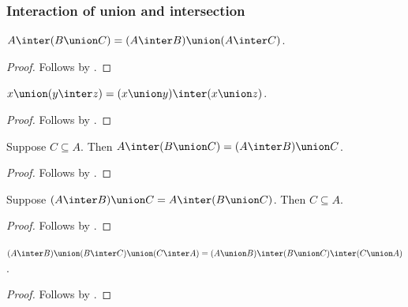 \subsubsection{Interaction of union and intersection}

\begin{proposition}%
\label{inter_distrib_union}
    $A\inter (B\union C) = (A\inter B)\union (A\inter C)$.
\end{proposition}
\begin{proof}
    Follows by .
\end{proof}

\begin{proposition}%
\label{union_distrib_inter}
    $x\union (y\inter z) = (x\union y)\inter (x\union z)$.
\end{proposition}
\begin{proof}
    Follows by .
\end{proof}

\begin{proposition}\label{union_inter_assoc_intro}
    Suppose $C\subseteq A$.
    Then $A\inter (B\union C) = (A\inter B)\union C$.
\end{proposition}
\begin{proof}
    Follows by .
\end{proof}

\begin{proposition}\label{union_inter_assoc_elim}
    Suppose $(A\inter B)\union C = A\inter (B\union C)$.
    Then $C\subseteq A$.
\end{proposition}
\begin{proof}
    Follows by .
\end{proof}

\begin{proposition}\label{union_inter_crazy}
    $(A\inter B)\union (B\inter C)\union (C\inter A)
    =
    (A\union B)\inter (B\union C)\inter (C\union A)$.
\end{proposition}
\begin{proof}
    Follows by .
\end{proof}


